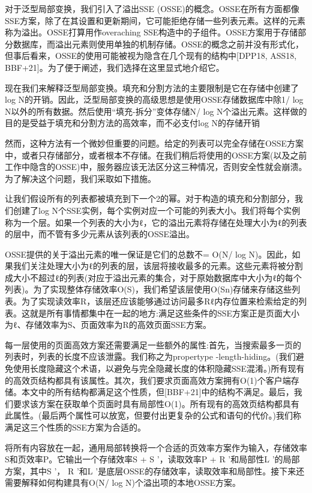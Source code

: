 \documentclass[UTF8]{article}
\begin{document}
对于泛型局部变换，我们引入了溢出SSE (OSSE)的概念。OSSE在所有方面都像SSE方案，除了在其设置和更新期间，它可能拒绝存储一些列表元素。这样的元素称为溢出。OSSE打算用作overaching SSE构造中的子组件。OSSE方案用于存储部分数据库，而溢出元素则使用单独的机制存储。OSSE的概念之前并没有形式化，但事后看来，OSSE的使用可能被视为隐含在几个现有的结构中[DPP18, ASS18, BBF+21]。为了便于阐述，我们选择在这里显式地介绍它。

现在我们来解释泛型局部变换。填充和分割方法的主要限制是它在存储中创建了log N的开销。因此，泛型局部变换的高级思想是使用OSSE存储数据库中除1/ log N以外的所有数据。然后使用“填充-拆分”变体存储N/ log N个溢出元素。这样做的目的是受益于填充和分割方法的高效率，而不必支付log N的存储开销

然而，这种方法有一个微妙但重要的问题。给定的列表可以完全存储在OSSE方案中，或者只存储部分，或者根本不存储。在我们稍后将使用的OSSE方案(以及之前工作中隐含的OSSE)中，服务器应该无法区分这三种情况，否则安全性就会崩溃。为了解决这个问题，我们采取如下措施。

让我们假设所有的列表都被填充到下一个2的幂。对于构造的填充和分割部分，我们创建了log N个SSE实例，每个实例对应一个可能的列表大小。我们将每个实例称为一个层。如果一个列表的大小为ℓ，它的溢出元素将存储在处理大小为ℓ的列表的层中，而不管有多少元素从该列表的OSSE溢出。

OSSE提供的关于溢出元素的唯一保证是它们的总数不= O(N/ log N)。因此，如果我们关注处理大小为ℓ的列表的层，该层将接收最多的元素。这些元素将被分割成大小不超过ℓ的列表(对应于溢出元素的集合，对于原始数据库中大小为ℓ的每个列表)。为了实现整体存储效率O(S)，我们希望该层使用O(Sn)存储来存储这些列表。为了实现读效率R，该层还应该能够通过访问最多Rℓ内存位置来检索给定的列表。这就是所有事情都集中在一起的地方:满足这些条件的SSE方案正是页面大小为ℓ、存储效率为S、页面效率为R的高效页面SSE方案。

每一层使用的页面高效方案还需要满足一些额外的属性:首先，当搜索最多一页的列表时，列表的长度不应该泄露。我们称之为propertype -length-hiding。(我们避免使用长度隐藏这个术语，以避免与完全隐藏长度的体积隐藏SSE混淆。)所有现有的高效页结构都具有该属性。其次，我们要求页面高效方案拥有O(1)个客户端存储。本文中的所有结构都满足这个性质，但[BBF+21]中的结构不满足。最后，我们要求该方案在获取单个页面时具有局部性O(1)。所有现有的高效页结构都具有此属性。(最后两个属性可以放宽，但要付出更复杂的公式和语句的代价。)我们称满足这三个性质的SSE方案为合适的。

将所有内容放在一起，通用局部转换将一个合适的页效率方案作为输入，存储效率S和页效率P。它输出一个存储效率S + S '，读取效率P + R '和局部性L '的局部方案，其中S '， R '和L '是底层OSSE的存储效率，读取效率和局部性。接下来还需要解释如何构建具有O(N/ log N)个溢出项的本地OSSE方案。
\end{document}
